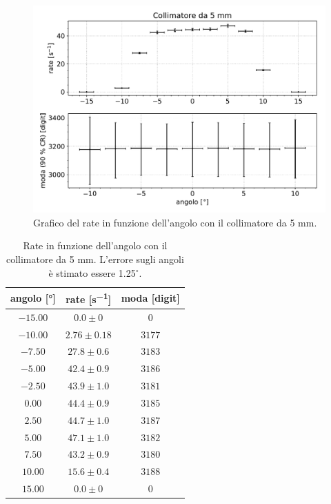 \begin{figure}[h]
\centering
\includegraphics[width=30 em]{immagini/coll5}
\caption{Grafico del rate in funzione dell'angolo con il collimatore da 5\! mm.}
\label{fig:coll5}
\end{figure}

\begin{table}[h]
\centering

\begin{tabular}{c|c|c}
angolo [\si{\degree}] & rate  [\si{s^{-1}}] & moda [digit] \\
\hline
$ -15.00 $ & $ 0.0 \pm 0 $ & $ 0 $ \\ 
$ -10.00 $ & $ 2.76 \pm 0.18 $ & $ 3177 $ \\ 
$ -7.50 $ & $ 27.8 \pm 0.6 $ & $ 3183 $ \\ 
$ -5.00 $ & $ 42.4 \pm 0.9 $ & $ 3186 $ \\ 
$ -2.50 $ & $ 43.9 \pm 1.0 $ & $ 3181 $ \\ 
$ 0.00 $ & $ 44.4 \pm 0.9 $ & $ 3185 $ \\ 
$ 2.50 $ & $ 44.7 \pm 1.0 $ & $ 3187 $ \\ 
$ 5.00 $ & $ 47.1 \pm 1.0 $ & $ 3182 $ \\ 
$ 7.50 $ & $ 43.2 \pm 0.9 $ & $ 3180 $ \\ 
$ 10.00 $ & $ 15.6 \pm 0.4 $ & $ 3188 $ \\ 
$ 15.00 $ & $ 0.0 \pm 0 $ & $ 0 $ \\ 

\end{tabular}

\caption{Rate in funzione dell'angolo con il collimatore da 5\! mm.
		L'errore sugli angoli è stimato essere 1.25$^{\circ}$.}
\label{tab:coll5}
\end{table}

